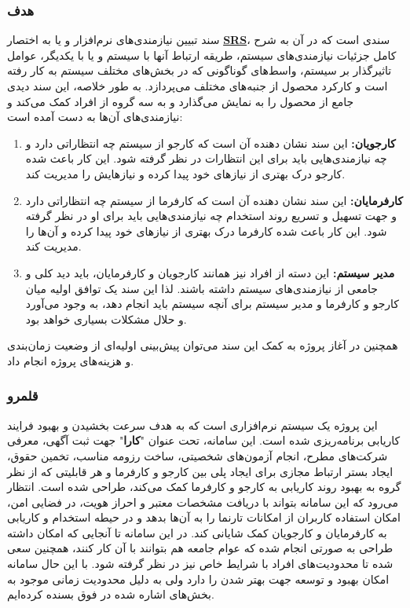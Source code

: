 \documentclass[12pt]{article}
\begin{document}
	\subsubsection{هدف}
	سند تبیین نیازمندی‌های نرم‌افزار و یا به اختصار
	\textbf{\hyperref[ref:srs]{SRS}}،
	سندی است که در آن به شرح کامل جزئیات نیازمندی‌های سیستم، طریقه ارتباط آنها با سیستم و یا با یکدیگر، عوامل تاثیرگذار بر سیستم، واسط‌های گوناگونی که در بخش‌های مختلف سیستم به کار رفته است و کارکرد محصول از جنبه‌های مختلف می‌پردازد.
	به طور خلاصه، این سند دیدی جامع از محصول را به نمایش می‌گذارد و به سه گروه از افراد کمک می‌کند و نیازمندی‌های آن‌ها به دست آمده است:

	\begin{enumerate}
		\item
		\textbf{کارجویان:}
		این سند نشان‌ دهنده آن است که کارجو از سیستم چه انتظاراتی دارد و چه نیازمندی‌هایی باید برای این انتظارات در نظر گرفته شود. این کار باعث شده کارجو درک بهتری از نیازهای خود پیدا کرده و نیازهایش را مدیریت کند.
		\item
		\textbf{کارفرمایان:}
		این سند نشان دهنده آن است که کارفرما از سیستم چه انتظاراتی دارد و جهت تسهیل و تسریع روند استخدام چه نیازمندی‌هایی باید برای او در نظر گرفته شود. این کار باعث شده کارفرما درک بهتری از نیاز‌های خود پیدا کرده و آن‌ها را مدیریت کند.
		\item
		\textbf{مدیر سیستم:}
		این دسته از افراد نیز همانند کارجویان و کارفرمایان، باید دید کلی و جامعی از نیازمندی‌های سیستم داشته باشند. لذا این سند یک توافق اولیه میان کارجو و کارفرما و مدیر سیستم برای آنچه سیستم باید انجام دهد، به وجود می‌آورد و حلال مشکلات بسیاری خواهد بود.
	\end{enumerate}
	همچنین در آغاز پروژه به کمک این سند می‌توان پیش‌بینی اولیه‌ای از وضعیت زمان‌بندی و هزینه‌های پروژه انجام داد.

	\subsubsection{قلمرو}
	این پروژه یک سیستم نرم‌افزاری است که به هدف سرعت بخشیدن و بهبود فرایند کاریابی برنامه‌ریزی شده است.
	این سامانه، تحت عنوان "\textbf{کارا}" جهت ثبت آگهی، معرفی شرکت‌های مطرح، انجام آزمون‌های شخصیتی، ساخت رزومه مناسب، تخمین حقوق، ایجاد بستر ارتباط مجازی برای ایجاد پلی بین کارجو و کارفرما و هر قابلیتی که از نظر گروه به بهبود روند کاریابی به کارجو و کارفرما کمک می‌کند، طراحی شده است.
	انتظار می‌رود که این سامانه بتواند با دریافت مشخصات معتبر و احراز هویت، در فضایی امن، امکان استفاده کاربران از امکانات تارنما را به آن‌ها بدهد و در حیطه استخدام و کاریابی به کارفرمایان و کارجویان کمک شایانی کند.
	در این سامانه تا آنجایی که امکان داشته طراحی به صورتی انجام شده که عوام جامعه هم بتوانند با آن کار کنند، همچنین سعی شده تا محدودیت‌های افراد با شرایط خاص نیز در نظر گرفته شود. با این حال سامانه امکان بهبود و توسعه جهت بهتر شدن را دارد ولی به دلیل محدودیت زمانی موجود به بخش‌های اشاره شده در فوق بسنده کرده‌ایم.
\end{document}
